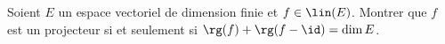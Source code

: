 \begin{enonce}
\begin{exercise}[ID={RMS135 E1411},subtitle={Navale MP 2024},tags={},difficulty={}]
Soient $E$ un espace vectoriel de dimension finie et $f \in \lin(E)$.
Montrer que $f$ est un projecteur si et seulement si $\rg(f) + \rg(f - \id) = \dim E$.
\end{exercise}
\begin{solution}
\end{solution}
\end{enonce}
